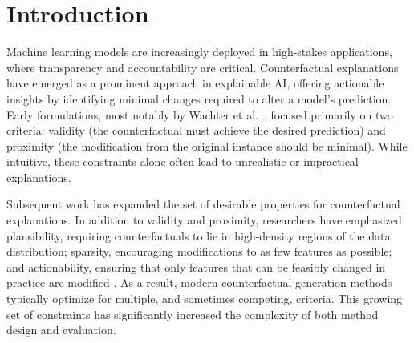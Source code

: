 \documentclass[runningheads]{llncs}
\begin{document}
\section{Introduction}
Machine learning models are increasingly deployed in high-stakes applications, where transparency and accountability are critical. Counterfactual explanations have emerged as a prominent approach in explainable AI, offering actionable insights by identifying minimal changes required to alter a model’s prediction. Early formulations, most notably by Wachter et al.~\cite{wachter2017counterfactual}, focused primarily on two criteria: validity (the counterfactual must achieve the desired prediction) and proximity (the modification from the original instance should be minimal). While intuitive, these constraints alone often lead to unrealistic or impractical explanations.


Subsequent work has expanded the set of desirable properties for counterfactual explanations. In addition to validity and proximity, researchers have emphasized plausibility, requiring counterfactuals to lie in high-density regions of the data distribution; sparsity, encouraging modifications to as few features as possible; and actionability, ensuring that only features that can be feasibly changed in practice are modified \cite{guidotti2024counterfactual}. As a result, modern counterfactual generation methods typically optimize for multiple, and sometimes competing, criteria. This growing set of constraints has significantly increased the complexity of both method design and evaluation. 
\end{document}
